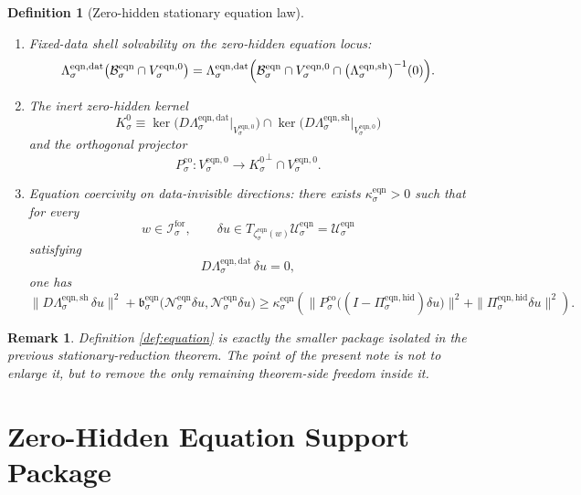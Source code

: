 \documentclass[11pt]{article}
\newcommand{\ForSpace}[1]{\mathcal I_{#1}^{\mathrm{for}}}
\newcommand{\Kernel}[1]{K_{#1}^{0}}
\newcommand{\StateComp}[1]{P_{#1}^{\mathrm{co}}}
\newcommand{\EqnSpace}[1]{\mathcal U_{#1}^{\mathrm{eqn}}}
\newcommand{\EqnBody}[1]{\mathcal B_{#1}^{\mathrm{eqn}}}
\newcommand{\EqnData}[1]{\Lambda_{#1}^{\mathrm{eqn,dat}}}
\newcommand{\EqnShell}[1]{\Lambda_{#1}^{\mathrm{eqn,sh}}}
\newcommand{\EqnPair}[1]{\mathfrak b_{#1}^{\mathrm{eqn}}}
\newcommand{\EqnZero}[1]{V_{#1}^{\mathrm{eqn},0}}
\newcommand{\EqnProj}[1]{\Pi_{#1}^{\mathrm{eqn,hid}}}
\newcommand{\EqnLin}[1]{\mathcal N_{#1}^{\mathrm{eqn}}}
\newcommand{\EqnEmbed}[1]{\zeta_{#1}^{\mathrm{eqn}}}
\newtheorem{definition}{Definition}
\newtheorem{remark}{Remark}
\begin{document}
\begin{definition}[Zero-hidden stationary equation law]
\begin{enumerate}
\begin{equation}
    \end{equation}
    for every \(w\in\ForSpace{\sigma}\).
    \item Fixed-data shell solvability on the zero-hidden equation locus:
    \begin{equation}
    \EqnData{\sigma}\bigl(
    \EqnBody{\sigma}\cap\EqnZero{\sigma}
    \bigr)
    =
    \EqnData{\sigma}\Bigl(
    \EqnBody{\sigma}\cap
    \EqnZero{\sigma}\cap
    \bigl(\EqnShell{\sigma}\bigr)^{-1}(0)
    \Bigr).
    \label{eq:eqnsolvability}
    \end{equation}
    \item The inert zero-hidden kernel
    \[
    \Kernel{\sigma}
    \equiv
    \ker\bigl(D\EqnData{\sigma}\big|_{\EqnZero{\sigma}}\bigr)
    \cap
    \ker\bigl(D\EqnShell{\sigma}\big|_{\EqnZero{\sigma}}\bigr)
    \]
    and the orthogonal projector
    \[
    \StateComp{\sigma}:
    \EqnZero{\sigma}\to
    {\Kernel{\sigma}}^{\perp}\cap\EqnZero{\sigma}.
    \]
    \item Equation coercivity on data-invisible directions: there exists \(\kappa_{\sigma}^{\mathrm{eqn}}>0\) such that for every
    \[
    w\in\ForSpace{\sigma},
    \qquad
    \delta u\in T_{\EqnEmbed{\sigma}(w)}\EqnSpace{\sigma}=\EqnSpace{\sigma}
    \]
    satisfying
    \[
    D\EqnData{\sigma}\,\delta u=0,
    \]
    one has
    \begin{equation}
    \|D\EqnShell{\sigma}\,\delta u\|^{2}
    +
    \EqnPair{\sigma}\bigl(\EqnLin{\sigma}\delta u,\EqnLin{\sigma}\delta u\bigr)
    \ge
    \kappa_{\sigma}^{\mathrm{eqn}}
    \left(
    \|\StateComp{\sigma}\bigl((I-\EqnProj{\sigma})\delta u\bigr)\|^{2}
    +
    \|\EqnProj{\sigma}\delta u\|^{2}
    \right).
    \label{eq:eqncoercive}
    \end{equation}
\end{enumerate}
\end{definition}

\begin{remark}
Definition \ref{def:equation} is exactly the smaller package isolated in the previous stationary-reduction theorem. The point of the present note is not to enlarge it, but to remove the only remaining theorem-side freedom inside it.
\end{remark}

\section{Zero-Hidden Equation Support Package}
\end{document}
